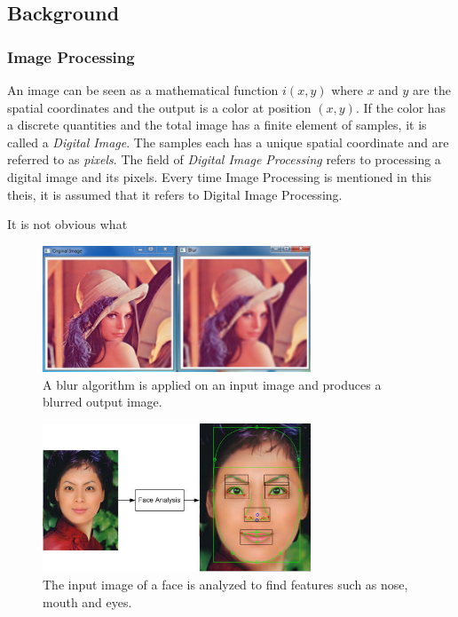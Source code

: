 \subsection{Background}
\subsubsection{Image Processing}
An image can be seen as a mathematical function $i(x,y)$ where $x$ and $y$ are the spatial coordinates and the output is a color at position $(x,y)$. If the color has a discrete quantities and the total image has a finite element of samples, it is called a \emph{Digital Image}. The samples each has a unique spatial coordinate and are referred to as \emph{pixels}. The field of \emph{Digital Image Processing} refers to processing a digital image and its pixels. Every time Image Processing is mentioned in this theis, it is assumed that it refers to Digital Image Processing. 
\newline

It is not obvious what 
\begin{figure}[ht!]
\centering
\includegraphics[width=80mm]{img/lena.png}
\caption{A blur algorithm is applied on an input image and produces a blurred output image.}
\label{lena}
\end{figure}

\begin{figure}[ht!]
\centering
\includegraphics[width=80mm]{img/feature.jpg}
\caption{The input image of a face is analyzed to find features such as nose, mouth and eyes.}
\label{feature}
\end{figure}
